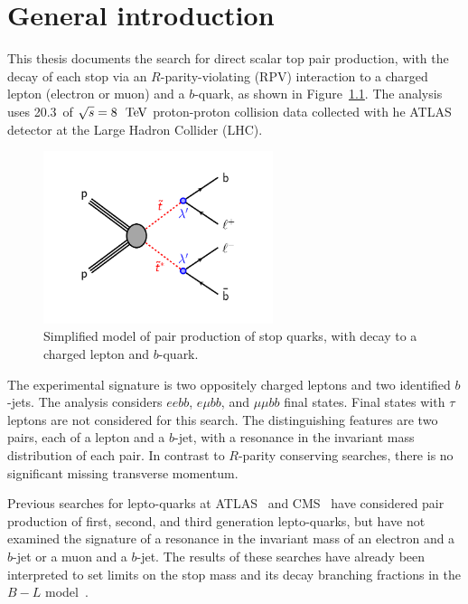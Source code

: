 \chapter[General introduction][General introduction]{General introduction}
\label{ch:intro}

This thesis documents the search for direct scalar top pair production, with
the decay of each stop via an $R$-parity-violating (RPV) interaction to a
charged lepton (electron or muon) and a $b$-quark, as shown in
Figure~\ref{fig:blstop_diagram}.
The analysis uses 20.3~\ifb of $\sqrt{s}=8~\TeV$ proton-proton collision data
collected with he ATLAS detector at the Large Hadron Collider (LHC).

\begin{figure}[ht]
  \centering
  \includegraphics[width=0.60\textwidth]{figs/blstop/b_minus_l_stop_stop.pdf}
  \caption{Simplified model of pair production of stop quarks, with decay to a
    charged lepton and $b$-quark.
  }
  \label{fig:blstop_diagram}
\end{figure}


The experimental signature is two oppositely charged leptons and two identified
$b$-jets.
The analysis considers $eebb$, $e \mu bb$, and $\mu \mu bb$ final states.
Final states with $\tau$ leptons are not considered for this search.
The distinguishing features are two pairs, each of a lepton and a $b$-jet, with
a resonance in the invariant mass distribution of each pair.
In contrast to $R$-parity conserving searches, there is no significant missing
transverse momentum.

Previous searches for lepto-quarks at ATLAS~\cite{ATLAS:2013oea,
ATLAS:2012aq, Aad:2011ch, Aad:2011uv} and
CMS~\cite{Khachatryan:2014ura, CMS:2014qpa, Chatrchyan:2012sv,
Chatrchyan:2012vza} have considered pair production of first, second,
and third generation lepto-quarks, but have not examined the signature
of a resonance in the invariant mass of an electron and a $b$-jet or a
muon and a $b$-jet.  The results of these searches have already been
interpreted to set limits on the stop mass and its decay
branching fractions in the $B-L$
model~\cite{Marshall:2014cwa, Marshall:2014kea}.

